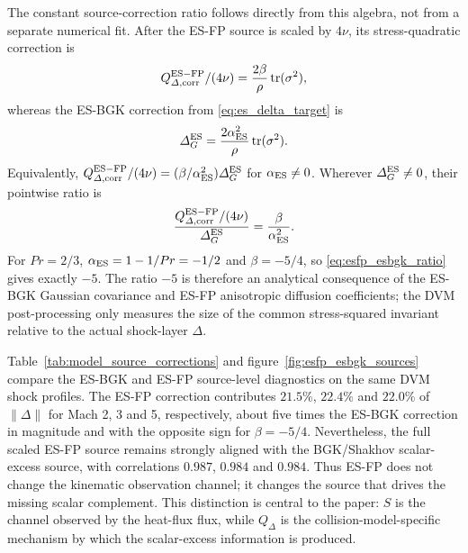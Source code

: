 \documentclass[lineno,paper]{JFM-FLM_Au}
\newenvironment{revision}{\nolinenumbers\begin{tcolorbox}[breakable,colback=revisionyellow,colframe=revisionyellow,boxrule=0pt,arc=0pt,left=5pt,right=5pt,top=5pt,bottom=5pt,before skip=6pt,after skip=6pt]\captionsetup{width=\linewidth}}{\end{tcolorbox}\linenumbers}
\newenvironment{revision}{}{}
\newcommand{\tr}{\operatorname{tr}}
\begin{document}
\begin{revision}
The constant source-correction ratio follows directly from this algebra, not from a separate numerical fit.  After the ES-FP source is scaled by $4\nu$, its stress-quadratic correction is
\begin{equation}
  Q_{\Delta,\mathrm{corr}}^{\rm ES-FP}/(4\nu)
  =\frac{2\beta}{\rho}\tr(\sigma^2),
\end{equation}
whereas the ES-BGK correction from \eqref{eq:es_delta_target} is
\begin{equation}
  \Delta_G^{\rm ES}
  =\frac{2\alpha_{\rm ES}^2}{\rho}\tr(\sigma^2).
\end{equation}
Equivalently, $Q_{\Delta,\mathrm{corr}}^{\rm ES-FP}/(4\nu)=(\beta/\alpha_{\rm ES}^2)\Delta_G^{\rm ES}$ for $\alpha_{\rm ES}\ne0$. Wherever $\Delta_G^{\rm ES}\ne0$, their pointwise ratio is
\begin{equation}
  \frac{Q_{\Delta,\mathrm{corr}}^{\rm ES-FP}/(4\nu)}{\Delta_G^{\rm ES}}
  =\frac{\beta}{\alpha_{\rm ES}^2}.
  \label{eq:esfp_esbgk_ratio}
\end{equation}
For $Pr=2/3$, $\alpha_{\rm ES}=1-1/Pr=-1/2$ and $\beta=-5/4$, so \eqref{eq:esfp_esbgk_ratio} gives exactly $-5$.  The ratio $-5$ is therefore an analytical consequence of the ES-BGK Gaussian covariance and ES-FP anisotropic diffusion coefficients; the DVM post-processing only measures the size of the common stress-squared invariant relative to the actual shock-layer $\Delta$.
\end{revision}

Table~\ref{tab:model_source_corrections} and figure~\ref{fig:esfp_esbgk_sources} compare the ES-BGK and ES-FP source-level diagnostics on the same DVM shock profiles.  The ES-FP correction contributes $21.5\%$, $22.4\%$ and $22.0\%$ of $\|\Delta\|$ for Mach 2, 3 and 5, respectively, about five times the ES-BGK correction in magnitude and with the opposite sign for $\beta=-5/4$.  Nevertheless, the full scaled ES-FP source remains strongly aligned with the BGK/Shakhov scalar-excess source, with correlations $0.987$, $0.984$ and $0.984$.  Thus ES-FP does not change the kinematic observation channel; it changes the source that drives the missing scalar complement.  This distinction is central to the paper: $S$ is the channel observed by the heat-flux flux, while $Q_\Delta$ is the collision-model-specific mechanism by which the scalar-excess information is produced.
\end{document}
